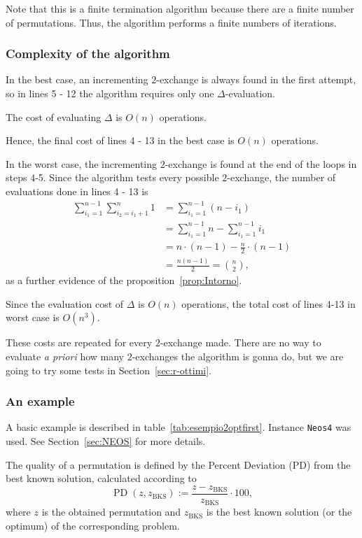 Note that this is a finite termination algorithm because there are a finite number of permutations. Thus, the algorithm performs a finite numbers of iterations.

\subsubsection{Complexity of the algorithm}
In the best case, an incrementing $2$-exchange is always found in the first attempt, so in lines 5 - 12 the algorithm requires only one $\Delta$-evaluation.

The cost of evaluating  $\Delta$ is $O(n)$ operations.

 Hence, the final cost of lines 4 - 13 in the best case is $O(n)$ operations.

In the worst case, the incrementing $2$-exchange is found at the end of the loops in steps 4-5.
Since the algorithm tests every possible $2$-exchange, the number of evaluations done in lines 4 - 13 is 
\begin{equation}
\label{eq:NumValut2Ottimi}
\begin{split}
\sum_{i_1=1}^{n-1}\sum_{i_2=i_1+1}^n 1 &= \sum_{i_1=1}^{n-1} (n-i_1) \\
&=  \sum_{i_1=1}^{n-1} n - \sum_{i_1=1}^{n-1}i_1 \\
&= n \cdot (n-1) - \frac{n}{2}\cdot (n-1) \\
&= \frac{n(n-1)}{2} = \binom{n}{2},
\end{split}
\end{equation}
\noindent as a further evidence of the proposition~\ref{prop:Intorno}. 

Since the evaluation cost of $\Delta$ is $O(n)$ operations, the total cost of lines 4-13 in worst case is $O(n^3)$.

These costs are repeated for every $2$-exchange made. There are no way to evaluate \textit{a priori} how many $2$-exchanges the algorithm is gonna do, but we are going to try some tests in Section~\ref{sec:r-ottimi}.




\subsubsection{An example}

\noindent A basic example is described in table~\ref{tab:esempio2optfirst}. Instance \texttt{Neos4} was used. See Section~\ref{sec:NEOS} for more details.

The quality of a permutation is defined by the  Percent Deviation (PD) from the best known solution, calculated according to 
\begin{equation}\label{eq:PD}
	\operatorname{PD}(z,z_\mathrm{BKS}):=\frac{z-z_\mathrm{BKS}}{z_\mathrm{BKS}}\cdot 100,
\end{equation}
\noindent where $z$  is the obtained permutation and $z_\mathrm{BKS}$ is the best known solution (or the optimum) of the corresponding problem.

